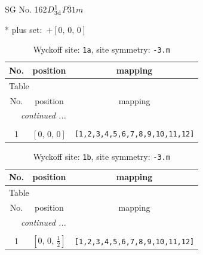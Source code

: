 \documentclass[fleqn,8pt]{jsarticle}
\begin{document}
\setcounter{MaxMatrixCols}{32}

\renewcommand{\tablename}{Table~}
\renewcommand{\figurename}{Figure~}
\begin{center}
\LARGE
SG No. 162\quad$D_{\rm 3d}^{1}$\quad$P\bar{3}1m$\quad[ trigonal ]
\end{center}
* plus set:\,\,\,$+\left[ 0,\, 0,\, 0 \right]$
\renewcommand{\arraystretch}{1.2}
\begin{longtable}{ccc}
\caption{Wyckoff site: {\tt 1a}, site symmetry: {\tt -3.m}}
 \\
 \hline \hline
No. & position & mapping \\ \hline \endfirsthead

\multicolumn{2}{l}{\tablename\ \thetable{}} \\
 \hline \hline
No. & position & mapping \\ \hline \endhead

 \hline \hline
\multicolumn{2}{r}{\footnotesize\it continued ...} \\ \endfoot

 \hline \hline
\multicolumn{2}{r}{} \\ \endlastfoot

1 & $\left[ 0,\, 0,\, 0 \right]$ & {\tt [1,2,3,4,5,6,7,8,9,10,11,12]} \\
\end{longtable}
\renewcommand{\arraystretch}{1.2}
\begin{longtable}{ccc}
\caption{Wyckoff site: {\tt 1b}, site symmetry: {\tt -3.m}}
 \\
 \hline \hline
No. & position & mapping \\ \hline \endfirsthead

\multicolumn{2}{l}{\tablename\ \thetable{}} \\
 \hline \hline
No. & position & mapping \\ \hline \endhead

 \hline \hline
\multicolumn{2}{r}{\footnotesize\it continued ...} \\ \endfoot

 \hline \hline
\multicolumn{2}{r}{} \\ \endlastfoot

1 & $\left[ 0,\, 0,\, \frac{1}{2} \right]$ & {\tt [1,2,3,4,5,6,7,8,9,10,11,12]} \\
\end{longtable}
\renewcommand{\arraystretch}{1.2}
\end{document}
